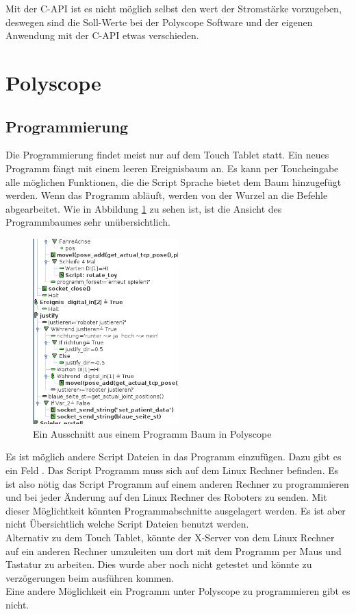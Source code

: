 Mit der C-\ac{API} ist es nicht möglich selbst den wert der Stromstärke vorzugeben, deswegen sind die Soll-Werte bei der Polyscope Software und der eigenen Anwendung mit der C-API etwas verschieden.

\section{Polyscope}
\label{sec:Polyscope_rel}

\subsection{Programmierung}
\label{sub:programmierung_polyscope_rel}

Die Programmierung findet meist nur auf dem Touch Tablet statt. Ein neues Programm fängt mit einem leeren Ereignisbaum an. Es kann per Toucheingabe alle möglichen Funktionen, die die Script Sprache bietet dem Baum hinzugefügt werden. Wenn das Programm abläuft, werden von der Wurzel an die Befehle abgearbeitet.
Wie in Abbildung \ref{fig:programm_in_polyscope} zu sehen ist, ist die Ansicht des Programmbaumes sehr unübersichtlich.

\begin{figure}[H]
  \centering
    \includegraphics[width=0.5\textwidth]{pic/polyscope_program_tree.png}
      \caption[Programm Baum in Polyscope]{Ein Ausschnitt aus einem Programm Baum in Polyscope}
      \label{fig:programm_in_polyscope}
\end{figure}

Es ist möglich andere Script Dateien in das Programm einzufügen. Dazu gibt es ein Feld . Das Script Programm muss sich auf dem Linux Rechner befinden. Es ist also nötig das Script Programm auf einem anderen Rechner zu programmieren und bei jeder Änderung auf den Linux Rechner des Roboters zu senden. Mit dieser Möglichtkeit könnten Programmabschnitte ausgelagert werden. Es ist aber nicht Übersichtlich welche Script Dateien benutzt werden.\\
Alternativ zu dem Touch Tablet, könnte der X-Server von dem Linux Rechner auf ein anderen Rechner umzuleiten um dort mit dem Programm per Maus und Tastatur zu arbeiten. Dies wurde aber noch nicht getestet und könnte zu verzögerungen beim ausführen kommen.
\\
Eine andere Möglichkeit ein Programm unter Polyscope zu programmieren gibt es nicht.

